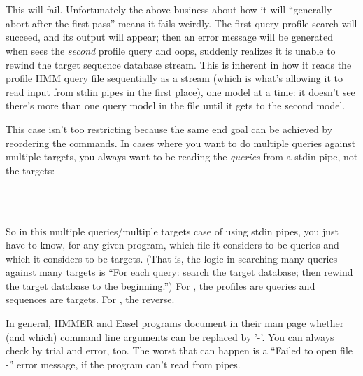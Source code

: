    \vspace{1ex}
   \begin{fullwidth}
   \\
   \\
   \end{fullwidth}
   \vspace{1ex}

This will fail. Unfortunately the above business about how it will
``generally abort after the first pass'' means it fails weirdly. The
first query profile search will succeed, and its output will appear;
then an error message will be generated when  sees the
\emph{second} profile query and oops, suddenly realizes it is unable
to rewind the target sequence database stream. This is inherent in how
it reads the profile HMM query file sequentially as a stream (which is
what's allowing it to read input from stdin pipes in the first place),
one model at a time: it doesn't see there's more than one query model
in the file until it gets to the second model.

This case isn't too restricting because the same end goal can be
achieved by reordering the commands. In cases where you want to do
multiple queries against multiple targets, you always want to be
reading the \emph{queries} from a stdin pipe, not the targets:

   \vspace{1ex}
   \\
   \\
   \vspace{1ex}

So in this multiple queries/multiple targets case of using stdin
pipes, you just have to know, for any given program, which file it
considers to be queries and which it considers to be targets. (That
is, the logic in searching many queries against many targets is ``For
each query: search the target database; then rewind the target
database to the beginning.'') For , the profiles are
queries and sequences are targets. For , the reverse.

In general, HMMER and Easel programs document in their man page
whether (and which) command line arguments can be replaced by '-'.
You can always check by trial and error, too. The worst that can
happen is a ``Failed to open file -'' error message, if the program
can't read from pipes.

